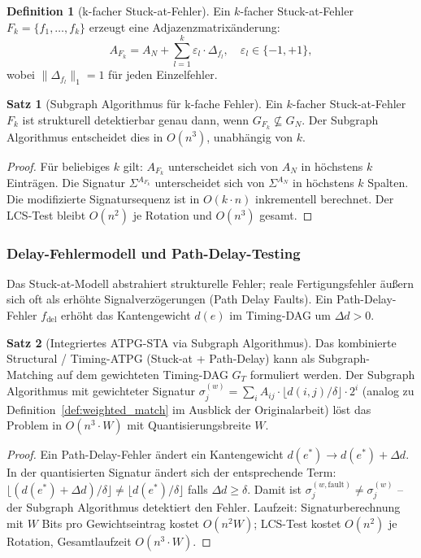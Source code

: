 ﻿\documentclass[a4paper,12pt]{article}
\theoremstyle{definition}
\newtheorem{definition}{Definition}
\newtheorem{satz}{Satz}
\begin{document}
\begin{definition}[k-facher Stuck-at-Fehler]\label{def:kfach}
  Ein $k$-facher Stuck-at-Fehler $F_k = \{f_1, \ldots, f_k\}$ erzeugt eine
  Adjazenzmatrixänderung:
  \[
    A_{F_k} = A_N + \sum_{l=1}^{k} \varepsilon_l \cdot \Delta_{f_l},
    \quad \varepsilon_l \in \{-1, +1\},
  \]
  wobei $\|\Delta_{f_l}\|_1 = 1$ für jeden Einzelfehler.
\end{definition}

\begin{satz}[Subgraph Algorithmus für k-fache Fehler]\label{satz:kfachfehler}
  Ein $k$-facher Stuck-at-Fehler $F_k$ ist strukturell detektierbar genau dann, wenn
  $G_{F_k} \not\subseteq G_N$. Der Subgraph Algorithmus entscheidet dies in
  $O(n^3)$, unabhängig von $k$.
\end{satz}

\begin{proof}
  Für beliebiges $k$ gilt: $A_{F_k}$ unterscheidet sich von $A_N$ in höchstens $k$
  Einträgen. Die Signatur $\Sigma^{A_{F_k}}$ unterscheidet sich von $\Sigma^{A_N}$
  in höchstens $k$ Spalten. Die modifizierte Signatursequenz ist in $O(k \cdot n)$
  inkrementell berechnet. Der LCS-Test bleibt $O(n^2)$ je Rotation und $O(n^3)$
  gesamt.
\end{proof}

\subsubsection{Delay-Fehlermodell und Path-Delay-Testing}

Das Stuck-at-Modell abstrahiert strukturelle Fehler; reale Fertigungsfehler äußern
sich oft als erhöhte Signalverzögerungen (Path Delay Faults). Ein Path-Delay-Fehler
$f_{\text{del}}$ erhöht das Kantengewicht $d(e)$ im Timing-DAG um $\Delta d > 0$.

\begin{satz}[Integriertes ATPG-STA via Subgraph Algorithmus]\label{satz:atpgsta}
  Das kombinierte Structural / Timing-ATPG (Stuck-at + Path-Delay) kann als
  Subgraph-Matching auf dem gewichteten Timing-DAG $G_T$ formuliert werden.
  Der Subgraph Algorithmus mit gewichteter Signatur
  $\sigma_j^{(w)} = \sum_i A_{ij} \cdot \lfloor d(i,j)/\delta \rfloor \cdot 2^i$
  (analog zu Definition~\ref{def:weighted_match} im Ausblick der Originalarbeit)
  löst das Problem in $O(n^3 \cdot W)$ mit Quantisierungsbreite $W$.
\end{satz}

\begin{proof}
  Ein Path-Delay-Fehler ändert ein Kantengewicht $d(e^*) \to d(e^*) + \Delta d$.
  In der quantisierten Signatur ändert sich der entsprechende Term:
  $\lfloor (d(e^*) + \Delta d)/\delta \rfloor \neq \lfloor d(e^*)/\delta \rfloor$
  falls $\Delta d \geq \delta$.
  Damit ist $\sigma_j^{(w, \text{fault})} \neq \sigma_j^{(w)}$ -- der Subgraph
  Algorithmus detektiert den Fehler. Laufzeit: Signaturberechnung mit $W$ Bits
  pro Gewichtseintrag kostet $O(n^2 W)$; LCS-Test kostet $O(n^2)$ je Rotation,
  Gesamtlaufzeit $O(n^3 \cdot W)$.
\end{proof}
\end{document}
